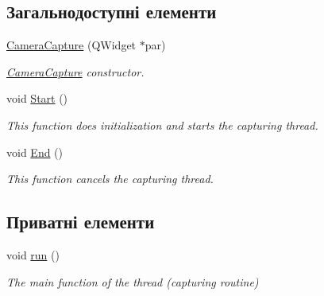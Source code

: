 \subsection*{Загальнодоступні елементи}
\begin{DoxyCompactItemize}
\item 
\hyperlink{classCameraCapture_a110d7f3ede7cb2e2b24584a9700abd2f}{Camera\-Capture} (Q\-Widget $\ast$par)
\begin{DoxyCompactList}\small\item\em \hyperlink{classCameraCapture}{Camera\-Capture} constructor. \end{DoxyCompactList}\item 
\hypertarget{classCameraCapture_a1ab7b68c620d79769afb3920320250fe}{void \hyperlink{classCameraCapture_a1ab7b68c620d79769afb3920320250fe}{Start} ()}\label{classCameraCapture_a1ab7b68c620d79769afb3920320250fe}

\begin{DoxyCompactList}\small\item\em This function does initialization and starts the capturing thread. \end{DoxyCompactList}\item 
\hypertarget{classCameraCapture_ab29bec18aca2752893b0dcd6b1870cc9}{void \hyperlink{classCameraCapture_ab29bec18aca2752893b0dcd6b1870cc9}{End} ()}\label{classCameraCapture_ab29bec18aca2752893b0dcd6b1870cc9}

\begin{DoxyCompactList}\small\item\em This function cancels the capturing thread. \end{DoxyCompactList}\end{DoxyCompactItemize}
\subsection*{Приватні елементи}
\begin{DoxyCompactItemize}
\item 
\hypertarget{classCameraCapture_ae1ee8fdcaae07e3a3aaf86b7d1f24558}{void \hyperlink{classCameraCapture_ae1ee8fdcaae07e3a3aaf86b7d1f24558}{run} ()}\label{classCameraCapture_ae1ee8fdcaae07e3a3aaf86b7d1f24558}

\begin{DoxyCompactList}\small\item\em The main function of the thread (capturing routine) \end{DoxyCompactList}\end{DoxyCompactItemize}
